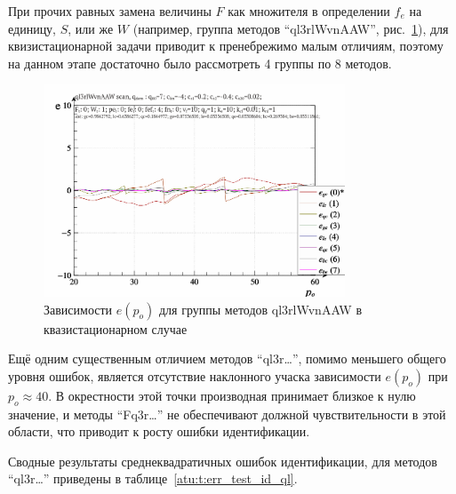 При прочих равных замена величины $F$ как множителя в определении $f_e$
на единицу, $S$, или же $W$
(например, группа методов ``ql3rlWvnAAW'', рис.~\ref{atu:f:ql3rlWvnAAW_scan}),
для квизистационарной задачи приводит к пренебрежимо малым отличиям,
поэтому на данном этапе достаточно было рассмотреть 4 группы по 8 методов.

\begin{figure}[htb!]
  \centerline{
    \includegraphics[width=0.8\textwidth]{p/scan/qls-p_p_e_ql3rlWvnAAW_scan.png}
  }
  \caption{Зависимости $e(p_o)$ для группы методов ql3rlWvnAAW в квазистационарном случае}
  \label{atu:f:ql3rlWvnAAW_scan}
\end{figure}

Ещё одним существенным отличием методов ``ql3r\ldots'',
помимо меньшего общего уровня ошибок,
является отсутствие наклонного учаска зависимости $e(p_o)$
при $p_o \approx 40$. В окрестности этой точки производная
принимает близкое к нулю значение, и методы ``Fq3r\ldots''
не обеспечивают должной чувствительности в этой области,
что приводит к росту ошибки идентификации.

Сводные результаты среднеквадратичных ошибок идентификации, для методов ``ql3r\ldots''
приведены в таблице~\ref{atu:t:err_test_id_ql}.

